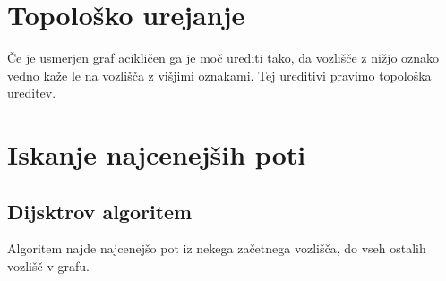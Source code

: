 \documentclass[10pt,a4paper,oneside]{book}
\begin{document}
\section{Topološko urejanje}
Če je usmerjen graf acikličen ga je moč urediti tako, da vozlišče z nižjo oznako vedno kaže le na vozlišča z višjimi oznakami. Tej ureditivi pravimo topološka ureditev. 


\section{Iskanje najcenejših poti}
\subsection{Dijsktrov algoritem}
Algoritem najde najcenejšo pot iz nekega začetnega vozlišča, do vseh ostalih vozlišč v grafu.

\end{document}
